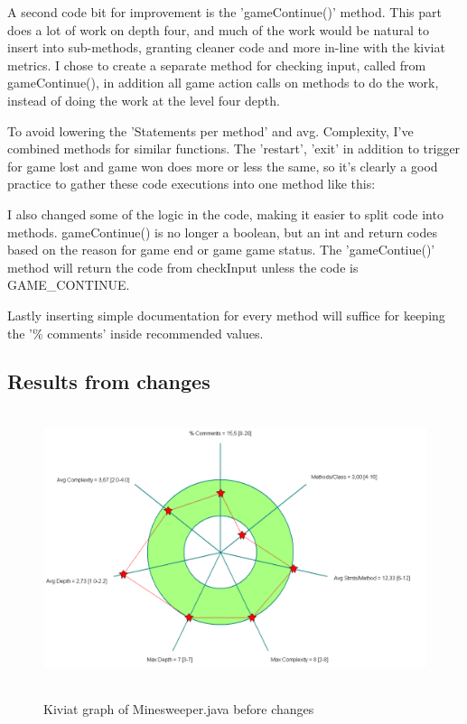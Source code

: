 \documentclass[UKenglish]{article}  %
\begin{document}
A second code bit for improvement is the 'gameContinue()' method. This part does
a lot of work on depth four, and much of the work would be natural to insert
into sub-methods, granting cleaner code and more in-line with the kiviat
metrics. I chose to create a separate method for checking input, called from
gameContinue(), in addition all game action calls on methods to do the work,
instead of doing the work at the level four depth. 

To avoid lowering the 'Statements per method' and avg. Complexity, I've
combined methods for similar functions. The 'restart', 'exit' in addition to
trigger for game lost and game won does more or less the same, so it's clearly a
good practice to gather these code executions into one method like this: 



I also changed some of the logic in the code, making it easier to split code
into methods. gameContinue() is no longer a boolean, but an int and return codes
based on the reason for game end or game game status. The 'gameContiue()' method
will return the code from checkInput unless the code is GAME\_CONTINUE.



Lastly inserting simple documentation for every method will suffice for keeping
the '\% comments' inside recommended values.



\subsection{Results from changes}
\begin{figure}
	\caption{Kiviat graph of Minesweeper.java before changes}
	\includegraphics[height=8cm]{kiviat_minesweeper_before}
	\label{minesweeper_before}
\end{figure}
\end{document}
